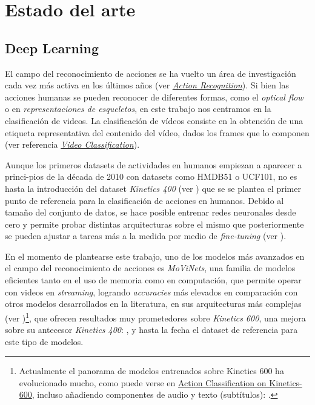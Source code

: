 \chapter{Estado del arte}\label{estado_del_arte}

\section{Deep Learning}

El campo del reconocimiento de acciones se ha vuelto un área de investigación cada vez más activa en los últimos años (ver \href{https://paperswithcode.com/task/action-recognition-in-videos}{\textit{Action Recognition}}). Si bien las acciones humanas se pueden reconocer de diferentes formas, como el \textit{optical flow} o en \textit{representaciones de esqueletos}, en este trabajo nos centramos en la clasificación de videos. La clasificación de vídeos consiste en la obtención de una etiqueta representativa del contenido del vídeo, dados los frames que lo componen (ver referencia \href{https://paperswithcode.com/task/video-classification}{\textit{Video Classification}}).

Aunque los primeros datasets de actividades en humanos empiezan a aparecer a princi-pios de la década de 2010 con datasets como HMDB51 o UCF101, no es hasta la introducción del dataset \textit{Kinetics 400} (ver \cite{Kinetics400}) que se se plantea el primer punto de referencia para la clasificación de acciones en humanos. Debido al tamaño del conjunto de datos, se hace posible entrenar redes neuronales desde cero y permite probar distintas arquitecturas sobre el mismo que posteriormente se pueden ajustar a tareas más a la medida por medio de \textit{fine-tuning} (ver \cite{I3D}).

En el momento de plantearse este trabajo, uno de los modelos más avanzados en el campo del reconocimiento de acciones es \textit{MoViNets}, una familia de modelos eficientes tanto en el uso de memoria como en computación, que permite operar con videos en \textit{streaming}, logrando  \textit{accuracies} más elevados en comparación con otros modelos desarrollados en la literatura, en sus arquitecturas más complejas (ver \cite{MoViNets})\footnote{Actualmente el panorama de modelos entrenados sobre Kinetics 600 ha evolucionado mucho, como puede verse en \href{https://paperswithcode.com/sota/action-classification-on-kinetics-600}{Action Classification on Kinetics-600}, incluso añadiendo componentes de audio y texto (subtítulos): \cite{Merlot}.}, que ofrecen resultados muy prometedores sobre \textit{Kinetics 600}, una mejora sobre su antecesor \textit{Kinetics 400}: \cite{Kinetics600}, y hasta la fecha el dataset de referencia para este tipo de modelos.

